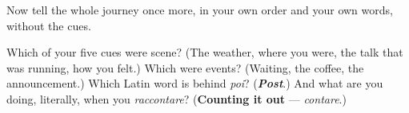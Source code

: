 Now tell the whole journey once more, in your own order and your own words, without the cues.

\begin{tcolorbox}[breakable,colback=teal!4,colframe=teal!35!black,title={Before you move on}]
Which of your five cues were scene? (The weather, where you were, the talk that was running, how you felt.) Which were events? (Waiting, the coffee, the announcement.) Which Latin word is behind \emph{poi}? (\emph{\textbf{Post}}.) And what are you doing, literally, when you \emph{raccontare}? (\textbf{Counting it out} — \emph{contare}.)
\end{tcolorbox}
